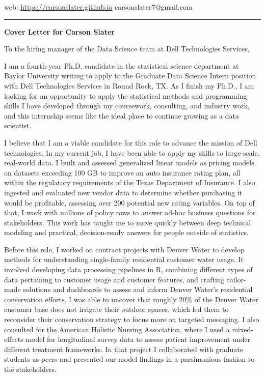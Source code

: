 \documentclass[11pt]{article}
\begin{document}
\noindent
web: \href{https://carsonslater.github.io}{https://carsonslater.github.io} \hfill carsonslater7@gmail.com \\
\rule{\textwidth}{0.4pt}

\vspace{2em}

\begin{center}
    \Large \textbf{Cover Letter for Carson Slater}
\end{center}

\vspace{1em}

\noindent
To the hiring manager of the Data Science team at Dell Technologies Services,

\vspace{1em}

\small
I am a fourth-year Ph.D. candidate in the statistical science department at Baylor University writing to apply to the Graduate Data Science Intern position with Dell Technologies Services in Round Rock, TX. As I finish my Ph.D., I am looking for an opportunity to apply the statistical methods and programming skills I have developed through my coursework, consulting, and industry work, and this internship seems like the ideal place to continue growing as a data scientist.

I believe that I am a viable candidate for this role to advance the mission of Dell technologies. In my current job, I have been able to apply my skills to large-scale, real-world data. I built and assessed generalized linear models as pricing models on datasets exceeding 100 GB to improve an auto insurance rating plan, all within the regulatory requirements of the Texas Department of Insurance. I also ingested and evaluated new vendor data to determine whether purchasing it would be profitable, assessing over 200 potential new rating variables. On top of that, I work with millions of policy rows to answer ad-hoc business questions for stakeholders. This work has taught me to move quickly between deep technical modeling and practical, decision-ready answers for people outside of statistics.

Before this role, I worked on contract projects with Denver Water to develop methods for understanding single-family residential customer water usage. It involved developing data processing pipelines in R, combining different types of data pertaining to customer usage and customer features, and crafting tailor-made solutions and dashboards to assess and inform Denver Water's residential conservation efforts. I was able to uncover that roughly 20\% of the Denver Water customer base does not irrigate their outdoor spaces, which led them to reconsider their conservation strategy to focus more on targeted messaging. I also consulted for the American Holistic Nursing Association, where I used a mixed-effects model for longitudinal survey data to assess patient improvement under different treatment frameworks. In that project I collaborated with graduate students as peers and presented our model findings in a parsimonious fashion to the stakeholders.
\end{document}
